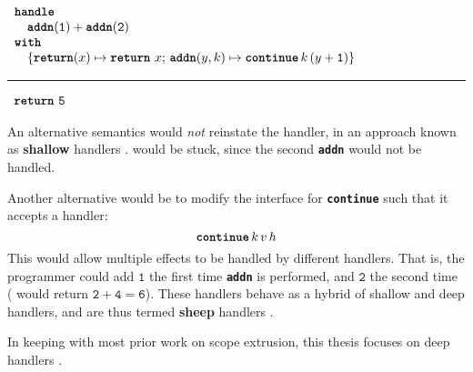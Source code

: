 \begin{enumerate}
         \begin{minipage}[t]{\linewidth}
          \centering
         \begin{efflst}
          $\begin{array}{l}
            \textbf{\texttt{handle}} \\
            \quad \textbf{\texttt{addn}}(\texttt{1}) + \textbf{\texttt{addn}}(\texttt{2}) \\
            \textbf{\texttt{with}} \\
            \quad \{ \textbf{\texttt{return}}(x) \mapsto {\texttt{\textbf{return}} \,\, {x}}; \, \textbf{\texttt{addn}}(y, k) \mapsto \textbf{\texttt{continue}} \, {k} \, {(y+\texttt{1})} \}\\
          \end{array}$
          \vspace{2mm} 
          \textcolor{effComment}{\hrule height 0.2mm \relax}
          \vspace{2mm} 
          
          \textcolor{effComment}{$\begin{array}{l}\texttt{\textbf{return}} \,\, {\texttt{5}}\end{array}$}
        \end{efflst}
        \centering
        \label{listing:eff-handler-type}
      \end{minipage}
      \par\vspace{0.6\baselineskip}
        An alternative semantics would \textit{not} reinstate the handler, in an approach known as \textbf{shallow} handlers \citep{hillestrom-2018}.  would be stuck, since the second \textbf{\texttt{addn}} would not be handled.

        Another alternative would be to modify the interface for \textbf{\texttt{continue}} such that it accepts a handler:
        \[\textbf{\texttt{continue}} \, k \,  v \, h\]
        This would allow multiple effects to be handled by different handlers. That is, the programmer could add $\texttt{1}$ the first time \textbf{\texttt{addn}} is performed, and $\texttt{2}$ the second time ( would return $\texttt{2}+\texttt{4}=\texttt{6}$). These handlers behave as a hybrid of shallow and deep handlers, and are thus termed \textbf{sheep} handlers \citep{phipps-costin-2023}. 
         
        In keeping with most prior work on scope extrusion, this thesis focuses on deep handlers \citep{isoda-24}. 


\end{enumerate}

